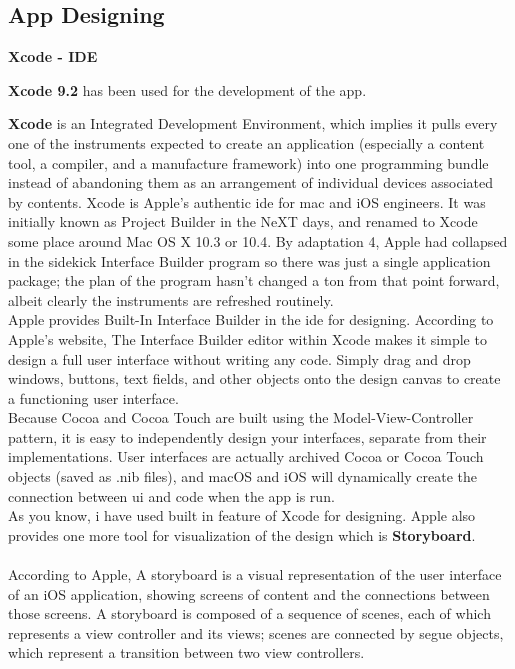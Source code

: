 \subsection{App Designing}
    
\centerline{\textbf{Xcode - IDE}}

\centerline{\textbf{Xcode 9.2} has been used for the development of the app.}

\textbf{Xcode} is an Integrated Development Environment, which implies it pulls every one of the instruments expected to create an application (especially a content tool, a compiler, and a manufacture framework) into one programming bundle instead of abandoning them as an arrangement of individual devices associated by contents. Xcode is Apple's authentic \gls{ide} for \gls{mac} and \gls{iOS} engineers. It was initially known as Project Builder in the NeXT days, and renamed to Xcode some place around Mac OS X 10.3 or 10.4. By adaptation 4, Apple had collapsed in the sidekick Interface Builder program so there was just a single application package; the plan of the program hasn't changed a ton from that point forward, albeit clearly the instruments are refreshed routinely. \\


Apple provides Built-In Interface Builder in the \gls{ide} for designing.
According to Apple's website, The Interface Builder editor within Xcode makes it simple to design a full user interface without writing any code. Simply drag and drop windows, buttons, text fields, and other objects onto the design canvas to create a functioning user interface. \\

Because Cocoa and Cocoa Touch are built using the Model-View-Controller pattern, it is easy to independently design your interfaces, separate from their implementations. User interfaces are actually archived Cocoa or Cocoa Touch objects (saved as .nib files), and \gls{macOS} and \gls{iOS} will dynamically create the connection between \gls{ui} and code when the app is run. \\

As you know, i have used built in feature of Xcode for designing. Apple also provides one more tool for visualization of the design which is \textbf{Storyboard}. \\ \\
According to Apple, A storyboard is a visual representation of the user interface of an \gls{iOS} application, showing screens of content and the connections between those screens. A storyboard is composed of a sequence of scenes, each of which represents a view controller and its views; scenes are connected by segue objects, which represent a transition between two view controllers. \\

